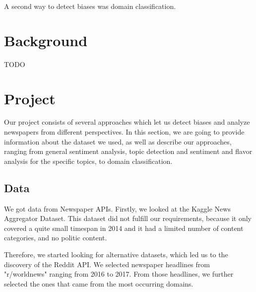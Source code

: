 \documentclass[final]{ieee}
\begin{document}
A second way to detect biases was domain classification.
            
            
\section{Background}
 
TODO
%            
%


\section{Project}

Our project consists of several approaches which let us detect biases and analyze newspapers from different perspectives. In this section, we are going to provide information about the dataset we used, as well as describe our approaches, ranging from general sentiment analysis, topic detection and sentiment and flavor analysis for the specific topics, to domain classification.

\subsection{Data}

We got data from Newspaper APIs. Firstly, we looked at the Kaggle News Aggregator Dataset. %
This dataset did not fulfill our requirements, because it only covered a quite small timespan in 2014 and it had a limited number of content categories, and no politic content.

Therefore, we started looking for alternative datasets, which led us to the discovery of the Reddit API. We selected newspaper headlines from "r/worldnews" ranging from 2016 to 2017. From those headlines, we further selected the ones that came from the most occurring domains. %
\end{document}
